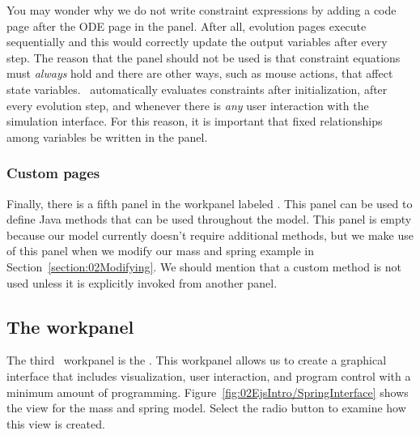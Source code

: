You may wonder why we do not write constraint expressions by adding a code page after the ODE page in the
 panel. After all, evolution pages execute sequentially and this would correctly update the output variables after every
step. The reason that the  panel should not be used is that constraint equations must \emph{always} hold
and there are other ways, such as mouse actions, that affect state variables. \ejs\ automatically evaluates constraints
after initialization, after every evolution step, and whenever there is \emph{any} user interaction with the simulation
interface. For this reason, it is important that fixed relationships among variables be written in the
 panel.

\subsubsection{Custom pages}

Finally, there is a fifth panel in the  workpanel labeled .  This panel can be used to define Java methods that can be used throughout the model.  This panel is empty because our model currently doesn't require additional methods, but we make use of this panel when we modify our mass and spring example in Section~\ref{section:02Modifying}.  We should mention that a custom method is not used unless it is explicitly invoked from another panel.

\subsection{The  workpanel}

The third \Ejs\ workpanel is the .  This workpanel allows us to create a graphical interface that includes visualization, user interaction, and program control with a minimum amount of programming.  Figure~\ref{fig:02EjsIntro/SpringInterface} shows the view for the mass and spring model. Select the  radio button to examine how this view is created.

